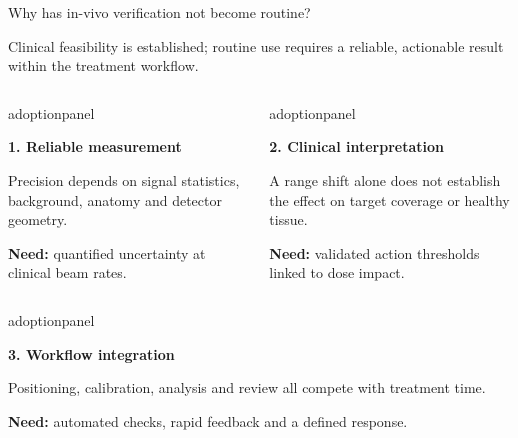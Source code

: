 \documentclass[aspectratio=169,11pt]{beamer}
\begin{document}
\begin{frame}{Why has in-vivo verification not become routine?}

{\small Clinical feasibility is established; routine use requires a reliable,
actionable result within the treatment workflow.\par}
\vspace{0.18cm}

\begin{columns}[T,onlytextwidth]
\begin{beamercolorbox}[sep=6pt,wd=\linewidth]{adoptionpanel}
\begin{minipage}[t][1.65cm][t]{\linewidth}\raggedright
{\footnotesize\bfseries\color{crBlue}1. Reliable measurement\par}
\vspace{0.07cm}
{\scriptsize
Precision depends on signal statistics, background, anatomy and detector geometry.\par
\vspace{0.08cm}
\textbf{Need:} quantified uncertainty at clinical beam rates.\par}
\end{minipage}
\end{beamercolorbox}

\begin{beamercolorbox}[sep=6pt,wd=\linewidth]{adoptionpanel}
\begin{minipage}[t][1.65cm][t]{\linewidth}\raggedright
{\footnotesize\bfseries\color{crBlue}2. Clinical interpretation\par}
\vspace{0.07cm}
{\scriptsize
A range shift alone does not establish the effect on target coverage or healthy tissue.\par
\vspace{0.08cm}
\textbf{Need:} validated action thresholds linked to dose impact.\par}
\end{minipage}
\end{beamercolorbox}
\end{columns}

\par\vspace{0.22cm}
\begin{columns}[T,onlytextwidth]
\begin{beamercolorbox}[sep=6pt,wd=\linewidth]{adoptionpanel}
\begin{minipage}[t][1.65cm][t]{\linewidth}\raggedright
{\footnotesize\bfseries\color{crBlue}3. Workflow integration\par}
\vspace{0.07cm}
{\scriptsize
Positioning, calibration, analysis and review all compete with treatment time.\par
\vspace{0.08cm}
\textbf{Need:} automated checks, rapid feedback and a defined response.\par}
\end{minipage}
\end{beamercolorbox}


\end{columns}
\end{frame}
\end{document}
